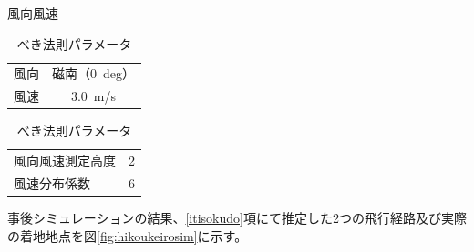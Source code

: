 \documentclass[a4paper,11pt,uplatex]{jsarticle}
\begin{document}
\begin{table}[H]
	\begin{minipage}[t]{0.55\hsize}
		\centering
		\caption{風向風速}
		\begin{tabular}[t]{lc} \hline
			風向 & 磁南（\SI{0}{deg}） \\
			風速 & \SI{3.0}{m/s}   \\\hline
		\end{tabular}
		\label{tab:huukouhuusoku}
	\end{minipage}
	\begin{minipage}[t]{0.55\hsize}
		\centering
		\caption{べき法則パラメータ}
		\begin{tabular}[t]{lr} \hline
			風向風速測定高度 & 2 \\
			風速分布係数   & 6 \\ \hline
		\end{tabular}
		\label{tab:bekihousoku}
	\end{minipage}
\end{table}

事後シミュレーションの結果、\ref{itisokudo}項にて推定した2つの飛行経路及び実際の着地地点を図\ref{fig:hikoukeirosim}に示す。
\end{document}
